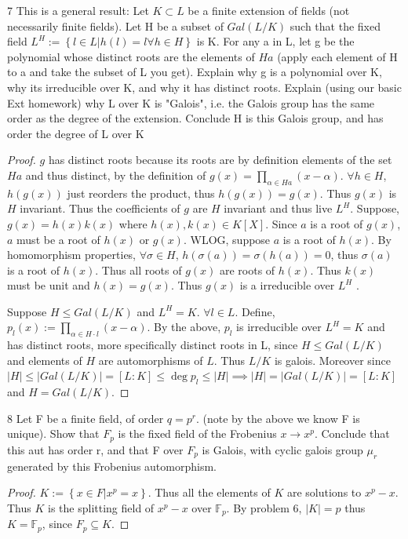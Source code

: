 \documentclass{article}
\newcommand{\F}{\mathbb{F}}
\begin{document}
\begin{PROB}{7}\label{Problem 7.}
    This is a general result: Let $K \subset L$ be a finite extension of fields (not necessarily finite fields). Let H be a subset of $Gal(L/K)$ such that the fixed field $L^H := \left\{ l \in L| h(l) = l \forall h \in H \right\}$ is K.  For any a in L, let g be the polynomial whose distinct roots are the elements of  $Ha$  (apply each element of H to a and take the subset of L you get). Explain why g is a polynomial over K, why its irreducible over K, and why it has distinct roots. Explain (using our basic Ext homework) why L over K is "Galois", i.e. the Galois group has the same order as the degree of the extension. Conclude H is this Galois group, and has order the degree of L over K
\end{PROB}
\begin{proof}
    $g$ has distinct roots because its roots are by definition elements of the set $Ha$ and thus distinct, by the definition of $g(x) = \prod_{\alpha \in Ha}(x- \alpha)$. $\forall h \in H$, $h(g(x))$ just reorders the product, thus $h(g(x)) = g(x)$. Thus $g(x)$ is $H$ invariant. Thus the coefficients of $g$ are $H$ invariant and thus live $L^H$. Suppose, $g(x) = h(x)k(x)$ where $h(x), k(x) \in K[X]$. Since $a$ is a root of $g(x)$, $a$ must be a root of $h(x)$ or $g(x)$. WLOG, suppose $a$ is a root of $h(x)$. By homomorphism properties, $\forall \sigma \in H$, $h(\sigma(a)) = \sigma(h(a)) = 0$, thus $\sigma(a)$ is a root of $h(x)$. Thus all roots of $g(x)$ are roots of $h(x)$. Thus $k(x)$ must be unit and $h(x) = g(x)$. Thus $g(x)$ is a irreducible over $L^H$ . 
    
    
    Suppose $H \leq Gal(L / K)$ and $L^H = K$. $\forall l \in L$. Define, $p_{l}(x) := \prod_{\alpha \in H\cdot l}(x - \alpha)$. By the above, $p_l$ is irreducible over $L^H = K$ and has distinct roots, more specifically distinct roots in L, since $H \leq Gal(L / K)$ and elements of $H$ are automorphisms of $L$. Thus $L / K$ is galois. Moreover since $|H| \leq |Gal(L / K)| = [L : K] \leq \deg p_{l} \leq |H| \implies |H| = |Gal( L / K)| = [L : K]$ and $H = Gal(L / K).$                           
\end{proof}

\bigskip


\begin{PROB}{8}\label{Problem 8.}
    Let F be a finite field, of order $q = p^r$. (note by the above we know F is unique). Show that $F_p$ is the fixed field of  the Frobenius  $x \to x^p$. Conclude that this aut has order r, and that F over $F_p$ is Galois, with cyclic galois group $\mu_r$ generated by this Frobenius automorphism. 
\end{PROB}
\begin{proof}
    $K := \left\{ x \in F | x^p = x \right\}$. Thus all the elements of $K$ are solutions to $x^p - x$. Thus $K$ is the splitting field of $x^p - x$ over $\F_p$. By problem 6, $|K| = p$ thus $K = \F_p$, since $F_p \subseteq K$.       

\end{proof}
\end{document}
